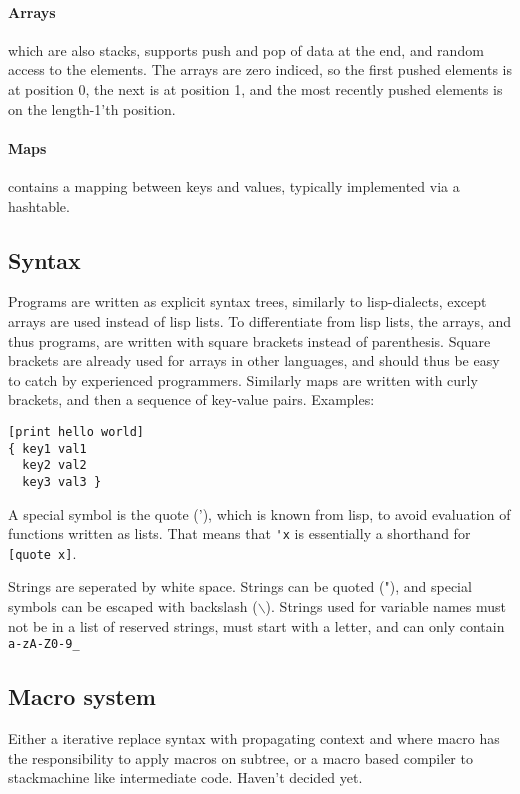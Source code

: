\paragraph{Arrays} which are also stacks, supports push and pop of data at the end, and random access to the elements. The arrays are zero indiced, so the first pushed elements is at position 0, the next is at position 1, and the most recently pushed elements is on the length-1'th position. 

\paragraph{Maps} contains a mapping between keys and values, typically implemented via a hashtable. 

\subsection{Syntax}

Programs are written as explicit syntax trees, similarly to lisp-dialects, except arrays are used instead of lisp lists.
To differentiate from lisp lists, the arrays, and thus programs, are written with square brackets instead of parenthesis.
Square brackets are already used for arrays in other languages, and should thus be easy to catch by experienced programmers. 
Similarly maps are written with curly brackets, and then a sequence of key-value pairs. Examples:
\begin{verbatim}
[print hello world]
{ key1 val1  
  key2 val2 
  key3 val3 }
\end{verbatim}

A special symbol is the quote ('), which is known from lisp, to avoid evaluation of functions written as lists. That means that \verb|'x| is essentially a shorthand for \verb|[quote x]|.

Strings are seperated by white space. Strings can be quoted ("), and special symbols can be escaped with backslash ($\backslash$). 
Strings used for variable names must not be in a list of reserved strings, must start with a letter, and can only contain \verb|a-zA-Z0-9_|

\subsection{Macro system}
Either a iterative replace syntax with propagating context and where macro has the responsibility to apply macros on subtree, or a macro based compiler to stackmachine like intermediate code.
Haven't decided yet.

